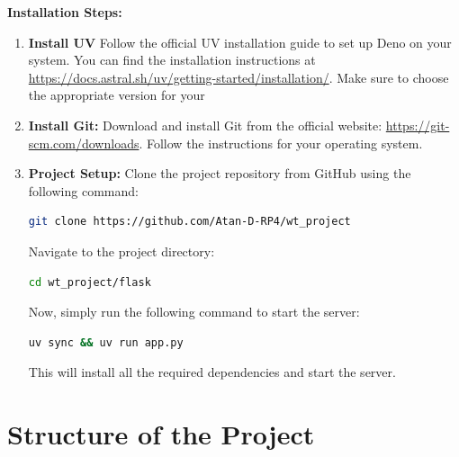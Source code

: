 \textbf{Installation Steps:}
\begin{enumerate}
    \item \textbf{Install UV}
    Follow the official UV installation guide to set up Deno on your system.
    You can find the installation instructions at
    \url{https://docs.astral.sh/uv/getting-started/installation/}. Make sure to choose the appropriate version for your

    \item \textbf{Install Git:}
    Download and install Git from the official website:
    \url{https://git-scm.com/downloads}. Follow the instructions for your
    operating system.

    \item \textbf{Project Setup:}
    Clone the project repository from GitHub using the following command:
    \begin{lstlisting}[language=bash]
        git clone https://github.com/Atan-D-RP4/wt_project
    \end{lstlisting}
    Navigate to the project directory:
    \begin{lstlisting}[language=bash]
        cd wt_project/flask
    \end{lstlisting}
    Now, simply run the following command to start the server:
    \begin{lstlisting}[language=bash]
        uv sync && uv run app.py
    \end{lstlisting}
    This will install all the required dependencies and start the server.
\end{enumerate}

\section{Structure of the Project}
